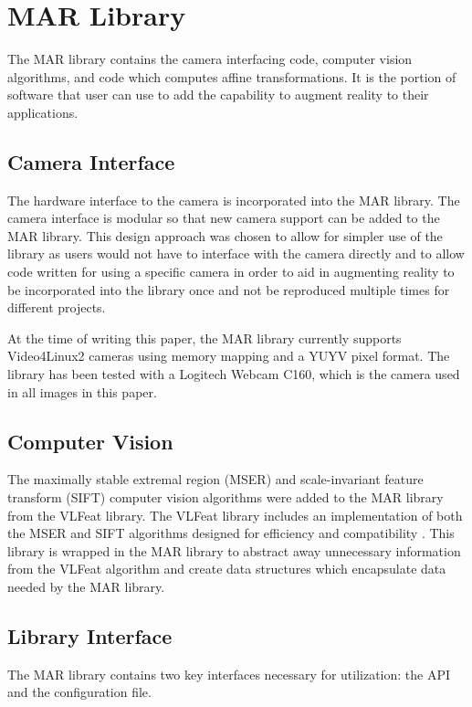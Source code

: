 \documentclass[oneside,11pt]{Latex/Classes/PhDthesisPSnPDF}
\begin{document}
\section{MAR Library}

The MAR library contains the camera interfacing code, computer vision algorithms, and code which computes affine transformations.  It is the portion of software that user can use to add the capability to augment reality to their applications.

\subsection{Camera Interface}

The hardware interface to the camera is incorporated into the MAR library.  The camera interface is modular so that new camera support can be added to the MAR library.  This design approach was chosen to allow for simpler use of the library as users would not have to interface with the camera directly and to allow code written for using a specific camera in order to aid in augmenting reality to be incorporated into the library once and not be reproduced multiple times for different projects.

At the time of writing this paper, the MAR library currently supports Video4Linux2 cameras using memory mapping and a YUYV pixel format.  The library has been tested with a Logitech Webcam C160, which is the camera used in all images in this paper.

\subsection{Computer Vision}

The maximally stable extremal region (MSER) and scale-invariant feature transform (SIFT) computer vision algorithms were added to the MAR library from the VLFeat library.  The VLFeat library includes an implementation of both the MSER and SIFT algorithms designed for efficiency and compatibility \cite{vlfeat_08}.  This library is wrapped in the MAR library to abstract away unnecessary information from the VLFeat algorithm and create data structures which encapsulate data needed by the MAR library.

\subsection{Library Interface}

The MAR library contains two key interfaces necessary for utilization: the API and the configuration file.
\end{document}
